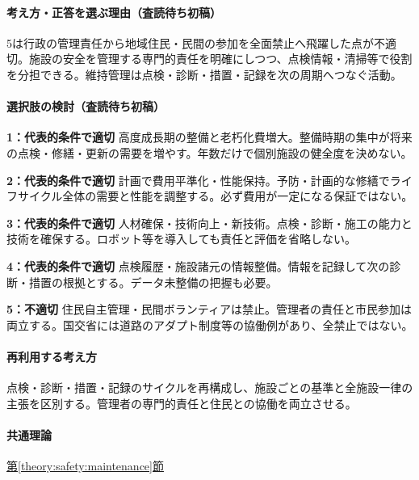 \paragraph{考え方・正答を選ぶ理由（査読待ち初稿）} 5は行政の管理責任から地域住民・民間の参加を全面禁止へ飛躍した点が不適切。施設の安全を管理する専門的責任を明確にしつつ、点検情報・清掃等で役割を分担できる。維持管理は点検・診断・措置・記録を次の周期へつなぐ活動。

\paragraph{選択肢の検討（査読待ち初稿）}\mbox{}\par

\noindent\textbf{1：代表的条件で適切} 高度成長期の整備と老朽化費増大。整備時期の集中が将来の点検・修繕・更新の需要を増やす。年数だけで個別施設の健全度を決めない。\par

\noindent\textbf{2：代表的条件で適切} 計画で費用平準化・性能保持。予防・計画的な修繕でライフサイクル全体の需要と性能を調整する。必ず費用が一定になる保証ではない。\par

\noindent\textbf{3：代表的条件で適切} 人材確保・技術向上・新技術。点検・診断・施工の能力と技術を確保する。ロボット等を導入しても責任と評価を省略しない。\par

\noindent\textbf{4：代表的条件で適切} 点検履歴・施設諸元の情報整備。情報を記録して次の診断・措置の根拠とする。データ未整備の把握も必要。\par

\noindent\textbf{5：不適切} 住民自主管理・民間ボランティアは禁止。管理者の責任と市民参加は両立する。国交省には道路のアダプト制度等の協働例があり、全禁止ではない。\par

\paragraph{再利用する考え方} 点検・診断・措置・記録のサイクルを再構成し、施設ごとの基準と全施設一律の主張を区別する。管理者の専門的責任と住民との協働を両立させる。

\paragraph{共通理論} \hyperref[theory:safety:maintenance]{第\ref*{theory:safety:maintenance}節}

